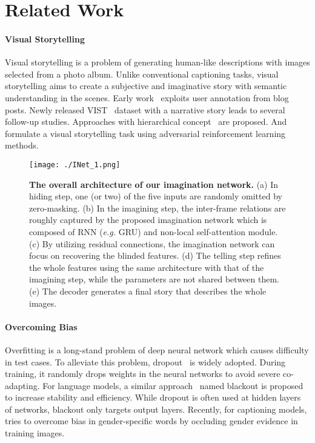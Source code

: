 \documentclass[letterpaper]{article} \usepackage{aaai20}  \usepackage{times}  \usepackage{helvet} \usepackage{courier}  \usepackage[hyphens]{url}  \usepackage{graphicx} \urlstyle{rm} \def\UrlFont{\rm}  \usepackage{graphicx}  \frenchspacing  \setlength{\pdfpagewidth}{8.5in}  \setlength{\pdfpageheight}{11in}
\newcommand{\eg}{{\it e.g. }}
\newcommand{\citet}[1]{\citeauthor{#1} \shortcite{#1}}
\begin{document}
\section{Related Work}




\paragraph{Visual Storytelling}
\quad

\noindent
Visual storytelling is a problem of generating human-like descriptions with images selected from a photo album. Unlike conventional captioning tasks, visual storytelling aims to create a subjective and imaginative story with semantic understanding in the scenes. Early work~\cite{park2015expressing} exploits user annotation from blog posts. Newly released VIST~\cite{huang2016visual} dataset with a narrative story leads to several follow-up studies. Approaches with hierarchical concept~\cite{yu2017hierarchically,wang2019hierarchical} are proposed. And~\citet{wang2018show,wang2018no} formulate a visual storytelling task using adversarial reinforcement learning methods.

\begin{figure*}[t]
\centering
\texttt{[image: ./INet\_1.png]}
\caption{\textbf{The overall architecture of our imagination network.} (a) In hiding step, one (or two) of the five inputs are randomly omitted by zero-masking. (b) In the imagining step, the inter-frame relations are roughly captured by the proposed imagination network which is composed of RNN (\eg GRU) and non-local self-attention module. (c) By utilizing residual connections, the imagination network can focus on recovering the blinded features. (d) The telling step refines the whole features using the same architecture with that of the imagining step, while the parameters are not shared between them. (e) The decoder generates a final story that describes the whole images.}
\label{fig:overview}
\end{figure*}

\paragraph{Overcoming Bias}
\quad

\noindent
Overfitting is a long-stand problem of deep neural network which causes difficulty in test cases. 
To alleviate this problem, dropout~\cite{srivastava2014dropout} is widely adopted. During training, it randomly drops weights in the neural networks to avoid severe co-adapting. For language models, a similar approach~\cite{ji2015blackout} named blackout is proposed to increase stability and efficiency. While dropout is often used at hidden layers of networks, blackout only targets output layers. Recently, for captioning models, \citet{burns2018women} tries to overcome bias in gender-specific words by occluding gender evidence in training images.
\end{document}
